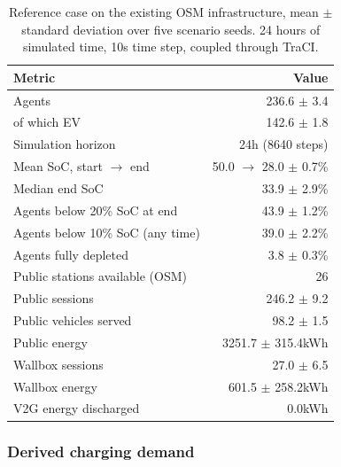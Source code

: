 \begin{table}[t]
\centering
\caption{Reference case on the existing \acs{OSM} infrastructure, mean $\pm$ standard deviation over five scenario seeds. 24 hours of simulated time, 10s time step, coupled through \acs{TraCI}.}
\label{tab:baseline}
\footnotesize
\setlength{\tabcolsep}{4pt}
\begin{tabular}{@{}lr@{}}
\toprule
Metric & Value \\
\midrule
Agents & 236.6 $\pm$ 3.4 \\
of which \acs{EV} & 142.6 $\pm$ 1.8 \\
Simulation horizon & 24h (8640 steps) \\
Mean \acs{SoC}, start $\rightarrow$ end & 50.0 $\rightarrow$ 28.0 $\pm$ 0.7\% \\
Median end \acs{SoC} & 33.9 $\pm$ 2.9\% \\
Agents below 20\% \acs{SoC} at end & 43.9 $\pm$ 1.2\% \\
Agents below 10\% \acs{SoC} (any time) & 39.0 $\pm$ 2.2\% \\
Agents fully depleted & 3.8 $\pm$ 0.3\% \\
\midrule
Public stations available (\acs{OSM}) & 26 \\
Public sessions & 246.2 $\pm$ 9.2 \\
Public vehicles served & 98.2 $\pm$ 1.5 \\
Public energy & 3251.7 $\pm$ 315.4kWh \\
Wallbox sessions & 27.0 $\pm$ 6.5 \\
Wallbox energy & 601.5 $\pm$ 258.2kWh \\
\acs{V2G} energy discharged & 0.0kWh \\
\bottomrule
\end{tabular}
\end{table}

\subsubsection{Derived charging demand}

